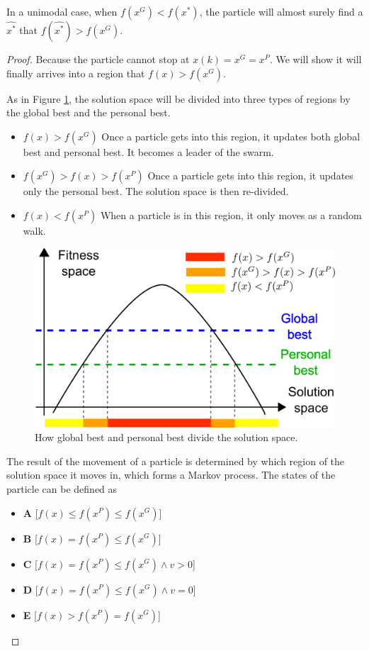 \begin{mythm}
\label{thm:unimodal:particle:better}
In a unimodal case, when $ f( x^{G} ) < f( x^{*}) $, the particle will almost surely find a $ \hat{x^{*}} $ that $ f(\hat{x^{*}}) > f(x^{G}) $.
\begin{proof}
Because the particle cannot stop at $ x(k) = x^{G} = x^{P} $.
We will show it will finally arrives into a region that $ f(x) > f(x^{G}) $.

As in Figure \ref{fig:categorize_regions}, the solution space will be divided into three types of regions by the global best and the personal best.
\begin{itemize}
\item $ f(x) > f(x^G) $
Once a particle gets into this region, it updates both global best and personal best. 
It becomes a leader of the swarm.
\item $ f(x^{G}) > f(x) > f(x^{P}) $
Once a particle gets into this region, it updates only the personal best.
The solution space is then re-divided.
\item $ f(x) < f(x^{P}) $
When a particle is in this region, it only moves as a random walk.
\end{itemize}

\begin{figure}
\centering
\includegraphics[width=0.7\linewidth]{./fig/categorize_regions}
\caption{How global best and personal best divide the solution space.}
\label{fig:categorize_regions}
\end{figure}

The result of the movement of a particle is determined by which region of the solution space it moves in, which forms a Markov process.
The states of the particle can be defined as
\begin{itemize}
\item \textbf{A} [$ f(x) \leq f(x^{P}) \leq f(x^{G}) $]
\item \textbf{B} [$ f(x) = f(x^{P}) \leq f(x^{G}) $] 
\item \textbf{C} [$ f(x) = f(x^{P}) \leq f(x^{G}) \land v > 0 $]
\item \textbf{D} [$ f(x) = f(x^{P}) \leq f(x^{G}) \land v = 0 $]
\item \textbf{E} [$ f(x) > f(x^{P}) = f(x^{G}) $]
\end{itemize}


\end{proof}
\end{mythm}
